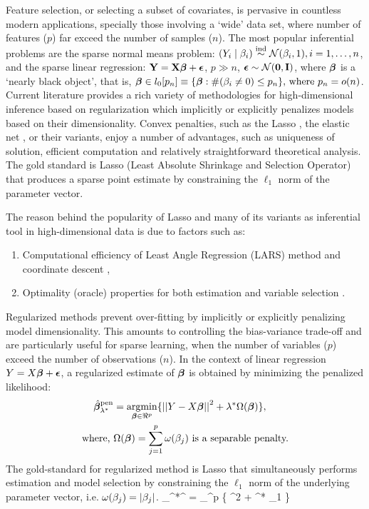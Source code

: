 \documentclass[chapters]{uamaththesis}
\begin{document}
Feature selection, or selecting a subset of covariates, is pervasive in countless modern applications, specially those involving a `wide' data set, where number of features ($p$) far exceed the number of samples ($n$). The most popular inferential problems are the sparse normal means problem: $(Y_i \mid \beta_i)  \stackrel{\mathrm{ind}}{\sim} \mathcal{N} (\beta_i,1), i = 1, \dots, n$, and the sparse linear regression: ${\bf Y} = {\bf X} \boldsymbol{\beta} + \boldsymbol{\epsilon}$, $p \gg n$, $\boldsymbol{\epsilon} \sim \mathcal{N}({\bf 0}, {\bf I})$, where $\boldsymbol{\beta}$ is a `nearly black object', that is, $\boldsymbol{\beta} \in l_0 [ p_n] \equiv \{ \boldsymbol{\beta} : \# ( \beta_i \neq 0 ) \leq p_n \}, \, \text{where } p_n = o(n) $. Current literature provides a rich variety of methodologies for high-dimensional inference based on regularization which implicitly or explicitly penalizes models based on their dimensionality. Convex penalties, such as the Lasso \citep{tibshirani96}, the elastic net \citep{zou2005regularization}, or their variants, enjoy a number of advantages, such as uniqueness of solution, efficient computation and relatively straightforward theoretical analysis. The gold standard is Lasso (Least Absolute Shrinkage and Selection Operator) that produces a sparse point estimate by constraining the $\ell_1$ norm of the parameter vector.  

The reason behind the popularity of Lasso \citep{tibshirani96} and many of its variants \citep{tibshirani2014praise} as inferential tool in high-dimensional data is due to factors such as: 
\begin{enumerate}
	\item Computational efficiency of Least Angle Regression (LARS) method \citep{efron_least_2004} and coordinate descent \citep{friedman_pathwise_2007}, 
	\item Optimality (oracle) properties for both estimation and variable selection \citep[\textit{vide}][]{buhlmann2011statistics, james2013introduction, hastie2015statistical}. 
\end{enumerate}

Regularized methods prevent over-fitting by implicitly or explicitly penalizing model dimensionality. This amounts to controlling the bias-variance trade-off and are particularly useful for sparse learning, when the number of variables ($p$) exceed the number of observations ($n$). In the context of linear regression $Y = X \boldsymbol{\beta} + \boldsymbol{\epsilon}$, a regularized estimate of $\boldsymbol{\beta}$ is obtained by minimizing the penalized likelihood:
\begin{align}
\hat{\bbeta}_{\lambda^*}^{\text{pen}} & = \argmin_{\bbeta \in \Re^p} \{ \vectornorm{Y - X\bbeta}^2 + \lambda^* \Omega(\bbeta) \}, \label{eq:penalize} \\
  \text{where, } & \Omega(\bbeta) = \sum_{j=1}^{p} \omega(\beta_j) \text{ is a separable penalty.} \nonumber
\end{align}
The gold-standard for regularized method is Lasso that simultaneously performs estimation and model selection by constraining the $\ell_1$ norm of the underlying parameter vector, i.e. $\omega(\beta_j) = \lvert\beta_j\rvert$. 
\beq
\hat{\bbeta}_{\lambda^*}^{} = \argmin_{\bbeta \in \Re^p} \{ ^2 + \lambda^* \norm{\bbeta}_1 \} \label{eq:lasso}
\eeq
\end{document}
